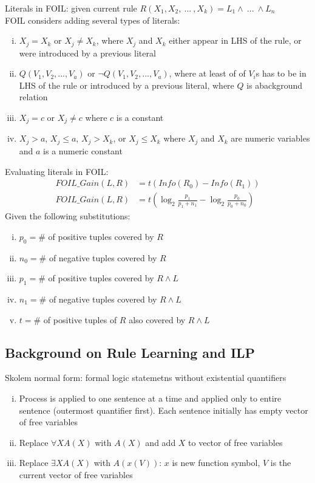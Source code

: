 \documentclass{article}
\begin{document}
			Literals in FOIL: given current rule $R(X_1, X_2,\:...\:, X_k) = L_1 \land\:...\:\land L_n$ \\
			FOIL considers adding several types of literals:
			\begin{enumerate}[(i)]
				\item $X_j = X_k$ or $X_j \neq X_k$, where $X_j$ and $X_k$ either appear in LHS of the rule, or were introduced by a previous literal
				\item $Q(V_1, V_2, ..., V_a)$ or $\neg Q(V_1, V_2, ..., V_a)$, where at least of of $V_i$s has to be in LHS of the rule or introduced by a previous literal, where $Q$ is abackground relation
				\item $X_j = c$ or $X_j \neq c$ where $c$ is a constant
				\item $X_j > a$, $X_j \leq a$, $X_j > X_k$, or $X_j \leq X_k$ where $X_j$ and $X_k$ are numeric variables and $a$ is a numeric constant
				\end{enumerate}
			Evaluating literals in FOIL: 
			\begin{align*}
				FOIL\_Gain(L, R) &= t(Info(R_0) - Info(R_1)) \\
				FOIL\_Gain(L, R) &= t\left(\log_2\frac{p_1}{p_1 + n_1} - \log_2\frac{p_0}{p_0 + n_0}\right)
				\end{align*}
			Given the following substitutions:
			\begin{enumerate}[(i)]
				\item $p_0 = \#$ of positive tuples covered by $R$
				\item $n_0 = \#$ of negative tuples covered by $R$
				\item $p_1 = \#$ of positive tuples covered by $R \land L$
				\item $n_1 = \#$ of negative tuples covered by $R \land L$
				\item $t = \#$ of positive tuples of $R$ also covered by $R \land L$
				\end{enumerate}
		\subsection{Background on Rule Learning and ILP}
			Skolem normal form: formal logic statemetns without existential quantifiers
			\begin{enumerate}[(i)]
				\item Process is applied to one sentence at a time and applied only to entire sentence (outermost quantifier first). Each sentence initially has empty vector of free variables
				\item Replace $\forall{X}A(X)$ with $A(X)$ and add $X$ to vector of free variables
				\item Replace $\exists{X}A(X)$ with $A(x(V))$: $x$ is new function symbol, $V$ is the current vector of free variables
				\end{enumerate}
		\clearpage

	
\end{document}
